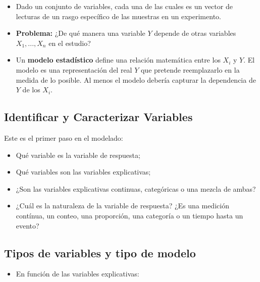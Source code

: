 \documentclass[]{book}
\providecommand{\tightlist}{%
  \setlength{\itemsep}{0pt}\setlength{\parskip}{0pt}}
\begin{document}
\begin{itemize}
\item
  Dado un conjunto de variables, cada una de las cuales es un vector de
  lecturas de un rasgo específico de las muestras en un experimento.
\item
  \textbf{Problema:} ¿De qué manera una variable \(Y\) depende de otras
  variables \(X_1,...,X_n\) en el estudio?
\item
  Un \textbf{modelo estadístico} define una relación matemática entre
  los \(X_i\) y \(Y\). El modelo es una representación del real \(Y\)
  que pretende reemplazarlo en la medida de lo posible. Al menos el
  modelo debería capturar la dependencia de \(Y\) de los \(X_i\).
\end{itemize}

\subsection{Identificar y Caracterizar
Variables}\label{identificar-y-caracterizar-variables}

Este es el primer paso en el modelado:

\begin{itemize}
\item
  Qué variable es la variable de respuesta;
\item
  Qué variables son las variables explicativas;
\item
  ¿Son las variables explicativas continuas, categóricas o una mezcla de
  ambas?
\item
  ¿Cuál es la naturaleza de la variable de respuesta? ¿Es una medición
  contínua, un conteo, una proporción, una categoría o un tiempo hasta
  un evento?
\end{itemize}

\subsection{Tipos de variables y tipo de
modelo}\label{tipos-de-variables-y-tipo-de-modelo}

\begin{itemize}
\tightlist
\item
  En función de las variables explicativas:
\end{itemize}
\end{document}
